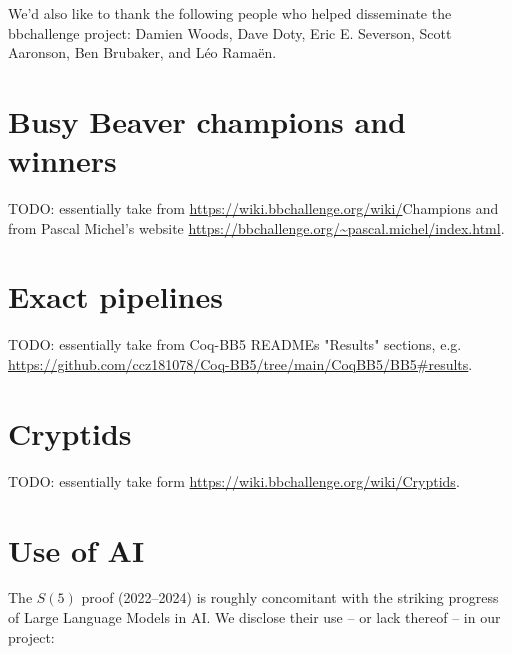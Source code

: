 \documentclass[a4paper,british]{article}
\theoremstyle{definition} %
\numberwithin{equation}{section}
\theoremstyle{definition} %
\newcommand{\ts}[1]{{\color{red}#1}}
\newcommand{\CoqBB}{Coq-BB5\xspace}
\begin{document}
We'd also like to thank the following people who helped disseminate the bbchallenge project: Damien Woods, Dave Doty, Eric E. Severson, Scott Aaronson, Ben Brubaker, and Léo Ramaën.
\newpage
\section{Busy Beaver champions and winners}\label{app:lowerbounds}

\ts{TODO: essentially take from \url{https://wiki.bbchallenge.org/wiki/}Champions and from Pascal Michel's website \url{https://bbchallenge.org/~pascal.michel/index.html}.}

\section{Exact pipelines}\label{app:pipelines}

\ts{TODO: essentially take from \CoqBB READMEs "Results" sections, e.g. \url{https://github.com/ccz181078/Coq-BB5/tree/main/CoqBB5/BB5\#results}.}

\section{Cryptids}\label{app:cryptids}

\ts{TODO: essentially take form \url{https://wiki.bbchallenge.org/wiki/Cryptids}.}

\section{Use of AI}

The $S(5)$ proof (2022--2024) is roughly concomitant with the striking progress of Large Language Models in AI. We disclose their use -- or lack thereof -- in our project:
\end{document}
